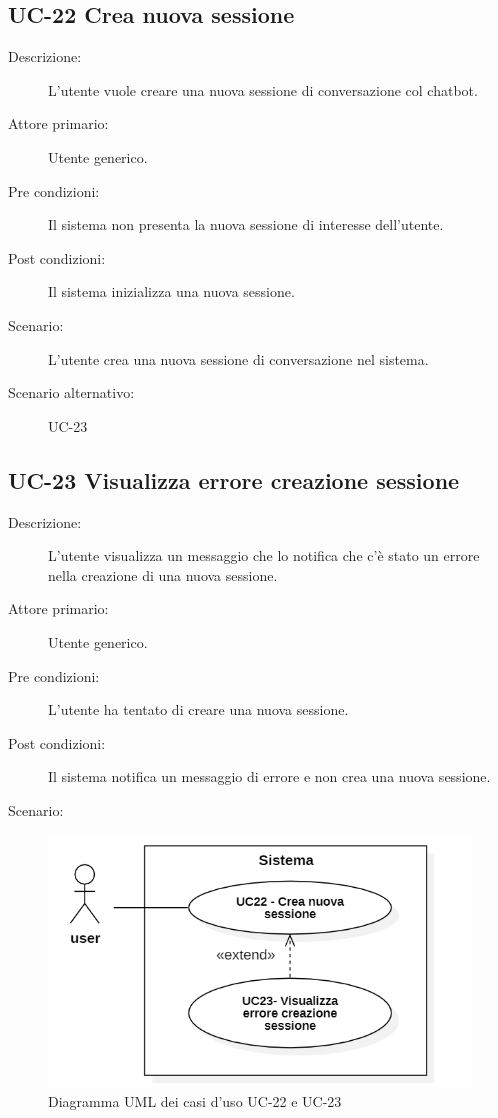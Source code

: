 \subsection{UC-22 Crea nuova sessione}
\begin{description}
    \item[Descrizione:] L'utente vuole creare una nuova sessione di conversazione col chatbot.
    \item[Attore primario:] Utente generico.
    \item[Pre condizioni:] Il sistema non presenta la nuova sessione di interesse dell'utente.
    \item[Post condizioni:] Il sistema inizializza una nuova sessione.
    \item[Scenario:] L'utente crea una nuova sessione di conversazione nel sistema.
    \item[Scenario alternativo:] UC-23
\end{description}

\subsection{UC-23 Visualizza errore creazione sessione}
\begin{description}
    \item[Descrizione:] L'utente visualizza un messaggio che lo notifica che c'è stato un errore nella creazione di una nuova sessione.
    \item[Attore primario:] Utente generico.
    \item[Pre condizioni:] L'utente ha tentato di creare una nuova sessione.
    \item[Post condizioni:] Il sistema notifica un messaggio di errore e non crea una nuova sessione.
    \item[Scenario:] 
\end{description}

\begin{figure}[H]
    \centering
    \includegraphics[width=0.8\linewidth]{UC22-23.PNG}
    \caption{Diagramma UML dei casi d'uso UC-22 e UC-23}
    \label{fig:UC22-23}
\end{figure}

